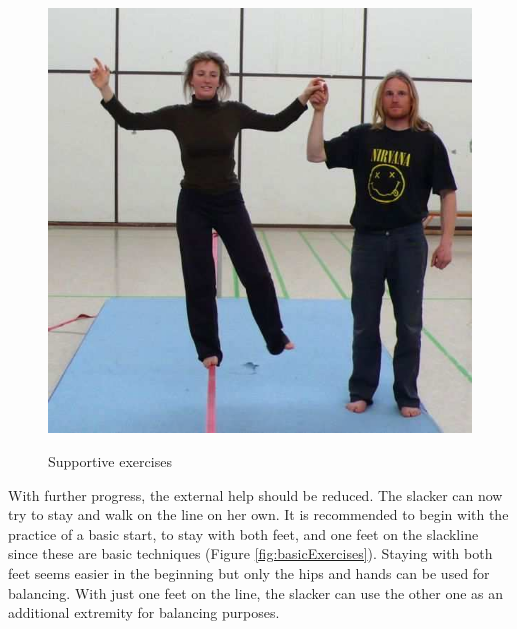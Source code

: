 \begin{figure}[htb]
\begin{minipage}[t]{0.37\linewidth}
		\label{fig:slacklineHelpBar}
	\end{minipage}
	\hfill
	\begin{minipage}[t]{0.3\linewidth}
		\centering
		\includegraphics[width=1\linewidth]{Pictures/slacklineHelpHuman}
		\label{fig:slacklineHelpHuman}
	\end{minipage}
	\caption{Supportive exercises~\cite{Kroiss2007-ab}}
	\label{fig:supportiveExercises}
\end{figure}

With further progress, the external help should be reduced. The slacker can now try to stay and walk on the line on her own. It is recommended to begin with the practice of a basic start, to stay with both feet, and one feet on the slackline since these are basic techniques (Figure \ref{fig:basicExercises}). Staying with both feet seems easier in the beginning but only the hips and hands can be used for balancing. With just one feet on the line, the slacker can use the other one as an additional extremity for balancing purposes.

